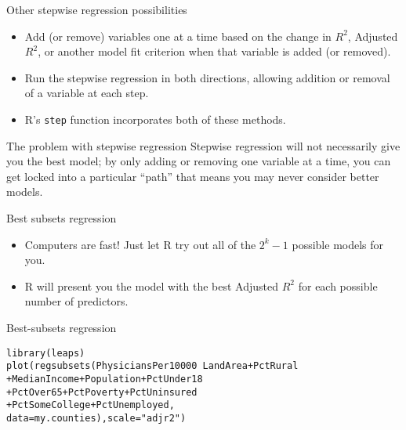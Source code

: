 \documentclass{beamer}\usepackage[]{graphicx}\usepackage[]{color}
\makeatletter
\newcommand{\hlstr}[1]{\textcolor[rgb]{1,0.894,0.71}{#1}}%
\newcommand{\hlopt}[1]{\textcolor[rgb]{1,0.894,0.769}{#1}}%
\newcommand{\hlstd}[1]{\textcolor[rgb]{1,0.894,0.769}{#1}}%
\newcommand{\hlkwc}[1]{\textcolor[rgb]{0.78,0.941,0.545}{#1}}%
\newcommand{\hlkwd}[1]{\textcolor[rgb]{1,0.78,0.769}{#1}}%
\newenvironment{kframe}{%
 \def\at@end@of@kframe{}%
 \ifinner\ifhmode%
  \def\at@end@of@kframe{\end{minipage}}%
  \begin{minipage}{\columnwidth}%
 \fi\fi%
 \def\FrameCommand##1{\hskip\@totalleftmargin \hskip-\fboxsep
 \colorbox{shadecolor}{##1}\hskip-\fboxsep
     \hskip-\linewidth \hskip-\@totalleftmargin \hskip\columnwidth}%
 \MakeFramed {\advance\hsize-\width
   \@totalleftmargin\z@ \linewidth\hsize
   \@setminipage}}%
 {\par\unskip\endMakeFramed%
 \at@end@of@kframe}
\newenvironment{knitrout}{}{} %
\makeatother
\begin{document}
\begin{darkframes}
    \begin{frame}{Other stepwise regression possibilities}
      \begin{itemize}
        \item Add (or remove) variables one at a time based on the change in $R^2$, Adjusted $R^2$, or another model fit criterion when that variable is added (or removed).
        \item Run the stepwise regression in both directions, allowing addition or removal of a variable at each step.
        \item R's \texttt{step} function incorporates both of these methods.
      \end{itemize}
    \end{frame}

    \begin{frame}{The problem with stepwise regression}
      Stepwise regression will not necessarily give you the best model; by only adding or removing one variable at a time, you can get locked into a particular ``path'' that means you may never consider better models.
    \end{frame}

    \begin{frame}{Best subsets regression}
      \begin{itemize}
        \item Computers are fast! Just let R try out all of the $2^k-1$ possible models for you.
        \item R will present you the model with the best Adjusted $R^2$ for each possible number of predictors.
      \end{itemize}
    \end{frame}

    \begin{frame}[fragile]{Best-subsets regression}
      \fontsm
\begin{knitrout}
\color{fgcolor}\begin{kframe}
\begin{alltt}
\hlkwd{library}\hlstd{(leaps)}
\hlkwd{plot}\hlstd{(}\hlkwd{regsubsets}\hlstd{(PhysiciansPer10000} \hlopt{~} \hlstd{LandArea} \hlopt{+} \hlstd{PctRural}
                 \hlopt{+} \hlstd{MedianIncome} \hlopt{+} \hlstd{Population} \hlopt{+} \hlstd{PctUnder18}
                 \hlopt{+} \hlstd{PctOver65} \hlopt{+} \hlstd{PctPoverty} \hlopt{+} \hlstd{PctUninsured}
                 \hlopt{+} \hlstd{PctSomeCollege} \hlopt{+} \hlstd{PctUnemployed,}
                 \hlkwc{data}\hlstd{=my.counties),} \hlkwc{scale}\hlstd{=}\hlstr{"adjr2"}\hlstd{)}
\end{alltt}
\end{kframe}
\end{knitrout}
    \end{frame}


\end{darkframes}
\end{document}
